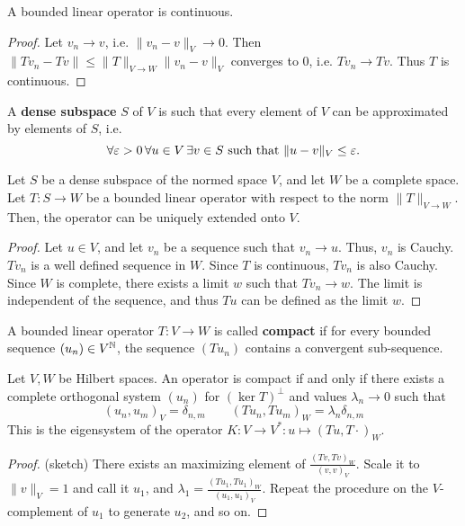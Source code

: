 \begin{lemma} A bounded linear operator is continuous.
\end{lemma}
\begin{proof} Let $v_n \rightarrow v$, i.e. $\| v_n - v \|_V \rightarrow 0$.  
Then $\| T v_n - T v \| \leq \| T \|_{V \rightarrow W } \| v_n - v \|_V$ converges to 0,
i.e. $T v_n \rightarrow T v$. Thus $T$ is continuous.
\end{proof}

\begin{definition} A {\bf dense subspace} $S$ of $V$ is such that every element of $V$ 
can be approximated by elements of $S$, i.e.
$$
\forall {\varepsilon> 0} \,  \forall { u \in V }  \, \exists { v \in S }  \mbox{ such that } \| u - v \|_V \leq \varepsilon.
$$
\end{definition}
\begin{lemma}  Let $S$ be a dense subspace of the normed space $V$, 
and let $W$ be a complete space. Let $T : S \rightarrow W$ be a bounded linear operator 
with respect to the norm $\| T \|_{V \rightarrow W}$. Then, the operator can be uniquely extended onto $V$.
\end{lemma}
\begin{proof} Let $u \in V$, and let $v_n$ be a sequence such that $v_n \rightarrow u$. Thus, $v_n$ is Cauchy. $T v_n$ is a well defined sequence in $W$. Since $T$ is continuous, $T v_n$ is also Cauchy. Since $W$ is complete, there exists a limit $w$ such that $T v_n \rightarrow w$. The limit is independent of the sequence, and thus $T u$ can be defined as the limit $w$.
\end{proof}



\begin{definition} A bounded linear operator $T : V \rightarrow W$ is called {\bf compact} if for every bounded sequence $(u_n) \in V^{\mathbb N}$, the sequence $(T u_n)$ contains a convergent sub-sequence.
\end{definition}

\begin{lemma} Let $V, W$ be Hilbert spaces. An operator is
  compact if and only if there exists a complete orthogonal system
  $(u_n)$ for $(\operatorname{ker} T)^\bot$ and values $\lambda_n \rightarrow 0$ such that
$$
(u_n, u_m)_V = \delta_{n,m} \qquad (T u_n, T u_m)_W = \lambda_n \delta_{n,m}
$$
This is the eigensystem of the operator $K : V \rightarrow V^\ast : u \mapsto (T u, T \cdot)_W$.
\end{lemma}
\begin{proof} (sketch) There exists an maximizing element of $\frac{ (Tv, Tv)_W } { (v,v)_V }$.
Scale it to $\| v \|_V = 1 $ and call it $u_1$, and $\lambda_1 = \frac{ (Tu_1, Tu_1)_W } { (u_1,u_1)_V }$. Repeat the procedure on the $V$-complement of $u_1$ to generate $u_2$, and so on. 
\end{proof}


